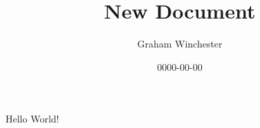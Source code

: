 \documentclass{article}
\title{New Document}
\date{0000-00-00}
\author{Graham Winchester}
\begin{document}
  \maketitle
  \newpage

  Hello World!
\end{document}
